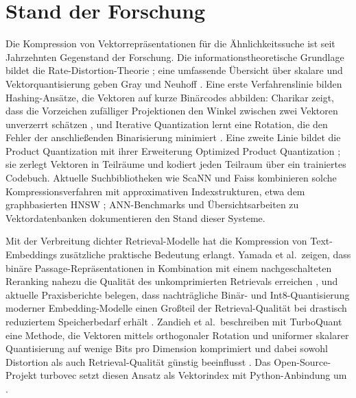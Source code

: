 \section{Stand der Forschung}
%
Die Kompression von Vektorrepräsentationen für die Ähnlichkeitssuche ist seit Jahrzehnten Gegenstand der Forschung.
Die informationstheoretische Grundlage bildet die Rate-Distortion-Theorie \cite{shannon_1959_ratedistortion}; eine umfassende Übersicht über skalare und Vektorquantisierung geben Gray und Neuhoff \cite{gray_1998_quantization}.
Eine erste Verfahrenslinie bilden Hashing-Ansätze, die Vektoren auf kurze Binärcodes abbilden: Charikar zeigt, dass die Vorzeichen zufälliger Projektionen den Winkel zwischen zwei Vektoren unverzerrt schätzen \cite{charikar_2002_simhash}, und Iterative Quantization lernt eine Rotation, die den Fehler der anschließenden Binarisierung minimiert \cite{gong_2013_itq}.
Eine zweite Linie bildet die Product Quantization \cite{jegou_2011_pq} mit ihrer Erweiterung Optimized Product Quantization \cite{ge_2014_opq}; sie zerlegt Vektoren in Teilräume und kodiert jeden Teilraum über ein trainiertes Codebuch.
Aktuelle Suchbibliotheken wie ScaNN \cite{guo_2020_scann} und Faiss \cite{johnson_2021_faiss,douze_2024_faiss} kombinieren solche Kompressionsverfahren mit approximativen Indexstrukturen, etwa dem graphbasierten HNSW \cite{malkov_2020_hnsw}; ANN-Benchmarks \cite{aumueller_2020_annbench} und Übersichtsarbeiten zu Vektordatenbanken \cite{pan_2024_vdbms} dokumentieren den Stand dieser Systeme.
\par
Mit der Verbreitung dichter Retrieval-Modelle \cite{reimers_2019_sbert,karpukhin_2020_dpr} hat die Kompression von Text-Embeddings zusätzliche praktische Bedeutung erlangt.
Yamada et al.\ zeigen, dass binäre Passage-Repräsentationen in Kombination mit einem nachgeschalteten Reranking nahezu die Qualität des unkomprimierten Retrievals erreichen \cite{yamada_2021_bpr}, und aktuelle Praxisberichte belegen, dass nachträgliche Binär- und Int8-Quantisierung moderner Embedding-Modelle einen Großteil der Retrieval-Qualität bei drastisch reduziertem Speicherbedarf erhält \cite{shakir_2024_embedding_quantization}.
Zandieh et al.\ beschreiben mit TurboQuant eine Methode, die Vektoren mittels orthogonaler Rotation und uniformer skalarer Quantisierung auf wenige Bits pro Dimension komprimiert und dabei sowohl Distortion als auch Retrieval-Qualität günstig beeinflusst \cite{zandieh_2025_turboquant}.
Das Open-Source-Projekt turbovec setzt diesen Ansatz als Vektorindex mit Python-Anbindung um \cite{turbovec_2024}.
\par
